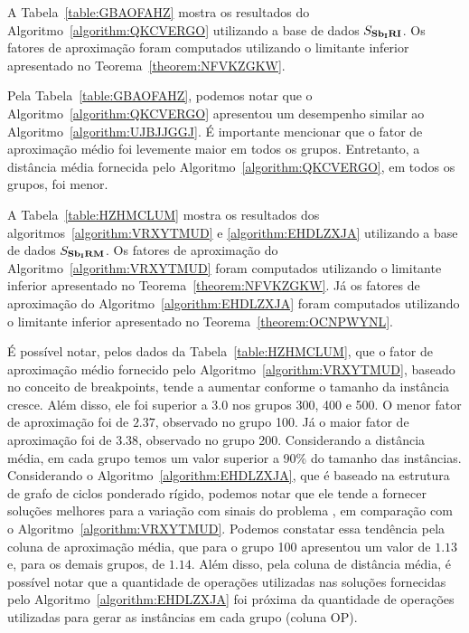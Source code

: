 A Tabela~\ref{table:GBAOFAHZ} mostra os resultados do Algoritmo~\ref{algorithm:QKCVERGO} utilizando a base de dados $S_{\textbf{Sb\textsubscript{I}RI}}{}$. Os fatores de aproximação foram computados utilizando o limitante inferior apresentado no Teorema~\ref{theorem:NFVKZGKW}.



Pela Tabela~\ref{table:GBAOFAHZ}, podemos notar que o Algoritmo~\ref{algorithm:QKCVERGO} apresentou um desempenho similar ao Algoritmo~\ref{algorithm:UJBJJGGJ}. É importante mencionar que o fator de aproximação médio foi levemente maior em todos os grupos. Entretanto, a distância média fornecida pelo Algoritmo~\ref{algorithm:QKCVERGO}, em todos os grupos, foi menor. 

A Tabela~\ref{table:HZHMCLUM} mostra os resultados dos algoritmos~\ref{algorithm:VRXYTMUD} e \ref{algorithm:EHDLZXJA} utilizando a base de dados $S_{\textbf{Sb\textsubscript{I}RM}}{}$. Os fatores de aproximação do Algoritmo~\ref{algorithm:VRXYTMUD} foram computados utilizando o limitante inferior apresentado no Teorema~\ref{theorem:NFVKZGKW}. Já os fatores de aproximação do Algoritmo~\ref{algorithm:EHDLZXJA} foram computados utilizando o limitante inferior apresentado no Teorema~\ref{theorem:OCNPWYNL}.



É possível notar, pelos dados da Tabela~\ref{table:HZHMCLUM}, que o fator de aproximação médio fornecido pelo Algoritmo~\ref{algorithm:VRXYTMUD}, baseado no conceito de breakpoints, tende a aumentar conforme o tamanho da instância cresce. Além disso, ele foi superior a $3.0$ nos grupos 300, 400 e 500. O menor fator de aproximação foi de $2.37$, observado no grupo 100. Já o maior fator de aproximação foi de $3.38$, observado no grupo 200. Considerando a distância média, em cada grupo temos um valor superior a 90\% do tamanho das instâncias. Considerando o Algoritmo~\ref{algorithm:EHDLZXJA}, que é baseado na estrutura de grafo de ciclos ponderado rígido, podemos notar que ele tende a fornecer soluções melhores para a variação com sinais do problema \SbIRM{}, em comparação com o Algoritmo~\ref{algorithm:VRXYTMUD}. Podemos constatar essa tendência pela coluna de aproximação média, que para o grupo 100 apresentou um valor de $1.13$ e, para os demais grupos, de $1.14$. Além disso, pela coluna de distância média, é possível notar que a quantidade de operações utilizadas nas soluções fornecidas pelo Algoritmo~\ref{algorithm:EHDLZXJA} foi próxima da quantidade de operações utilizadas para gerar as instâncias em cada grupo (coluna OP).

